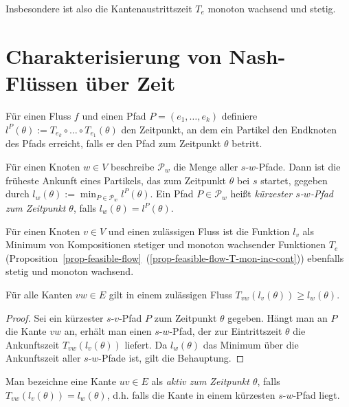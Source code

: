 Insbesondere ist also die Kantenaustrittszeit $T_e$ monoton wachsend und stetig.


\section{Charakterisierung von Nash-Flüssen über Zeit}

\begin{definition}
	Für einen Fluss $f$ und einen Pfad $P=(e_1,\dots,e_k)$ definiere $l^P(\theta):=T_{e_k}\circ\dots\circ T_{e_1}(\theta)$ den Zeitpunkt, an dem ein Partikel den Endknoten des Pfads erreicht, falls er den Pfad zum Zeitpunkt $\theta$ betritt.
	
	Für einen Knoten $w\in V$ beschreibe $\mathcal{P}_w$ die Menge aller $s$-$w$-Pfade.
	Dann ist die früheste Ankunft eines Partikels, das zum Zeitpunkt $\theta$ bei $s$ startet, gegeben durch $l_w(\theta):=\min_{P\in\mathcal{P}_w}l^P(\theta)$.
	Ein Pfad $P\in \mathcal{P}_w$ heißt \emph{kürzester $s$-$w$-Pfad zum Zeitpunkt $\theta$},  falls $l_w(\theta)=l^P(\theta)$.
\end{definition}

Für einen Knoten $v \in V$ und einen zulässigen Fluss ist die Funktion $l_v$ als Minimum von Kompositionen stetiger und monoton wachsender Funktionen $T_e$ (Proposition~\ref{prop-feasible-flow}~(\ref{prop-feasible-flow-T-mon-inc-cont})) ebenfalls stetig und monoton wachsend.


\begin{lemma}\label{lemma-dreicksungl}
	Für alle Kanten $vw\in E$ gilt in einem zulässigen Fluss 
	$T_{vw}(l_v(\theta)) \geq l_w(\theta)$.
\end{lemma}
\begin{proof}
	Sei ein kürzester $s$-$v$-Pfad $P$ zum Zeitpunkt $\theta$ gegeben.
	Hängt man an $P$ die Kante $vw$ an, erhält man einen $s$-$w$-Pfad, der zur Eintrittszeit $\theta$ die Ankunftszeit $T_{vw}(l_v(\theta))$ liefert.
	Da $l_w(\theta)$ das Minimum über die Ankunftszeit aller $s$-$w$-Pfade ist, gilt die Behauptung.
\end{proof}

\begin{definition}
	Man bezeichne eine Kante $uv\in E$ als \emph{aktiv zum Zeitpunkt $\theta$}, falls $T_{vw}(l_v(\theta)) = l_w(\theta)$, d.h. falls die Kante in einem kürzesten $s$-$w$-Pfad liegt.
\end{definition}

